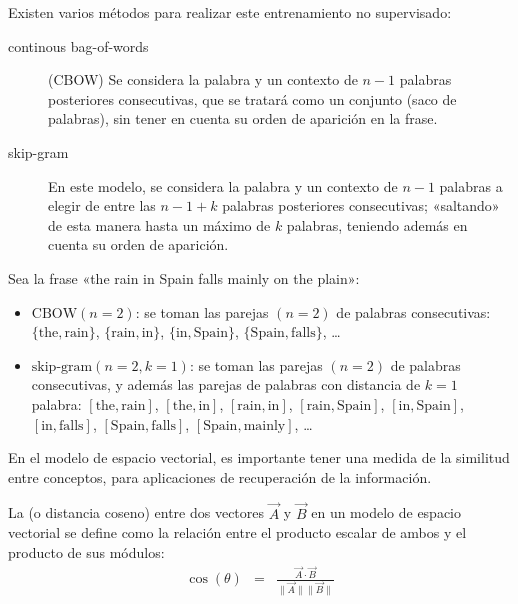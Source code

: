 Existen varios métodos para realizar este entrenamiento no supervisado:
\begin{description}
\item[continous bag-of-words] (CBOW) Se considera la palabra y un contexto de $n-1$ palabras posteriores consecutivas, que se tratará como un conjunto (saco de palabras), sin tener en cuenta su orden de aparición en la frase.
\item[skip-gram]  En este modelo, se considera la palabra y un contexto de $n-1$ palabras a elegir de entre las $n-1 + k$ palabras posteriores consecutivas; «saltando» de esta manera hasta un máximo de $k$ palabras, teniendo además en cuenta su orden de aparición.
\end{description}

\begin{example}
Sea la frase «the rain in Spain falls mainly on the plain»:
\begin{itemize}
\item $\text{CBOW}(n=2)$: se toman las parejas $(n=2)$ de palabras consecutivas:
$\{\text{the}, \text{rain}\}$,
$\{\text{rain}, \text{in}\}$,
$\{\text{in}, \text{Spain}\}$,
$\{\text{Spain}, \text{falls}\}$, \ldots
\item $\text{skip-gram}(n=2,k=1)$: se toman las parejas $(n=2)$ de palabras consecutivas, y además las parejas de palabras con distancia de $k=1$ palabra: 
$[\text{the}, \text{rain}]$,
$[\text{the}, \text{in}]$,
$[\text{rain}, \text{in}]$,
$[\text{rain}, \text{Spain}]$, 
$[\text{in}, \text{Spain}]$, 
$[\text{in}, \text{falls}]$, 
$[\text{Spain}, \text{falls}]$, 
$[\text{Spain}, \text{mainly}]$, \ldots
\end{itemize}
\end{example}

En el modelo de espacio vectorial, es importante tener una medida de la similitud entre conceptos, para aplicaciones de recuperación de la información.
\begin{definition}
La  (o distancia coseno) entre dos vectores $\vec{A}$ y $\vec{B}$ en un modelo de espacio vectorial se define como la relación entre el producto escalar de ambos y el producto de sus módulos:
\begin{eqnarray}
\cos(\theta) &=& \frac{\vec{A}\cdot\vec{B}}{\|\vec{A}\| \|\vec{B}\|}
\end{eqnarray}
\end{definition}

